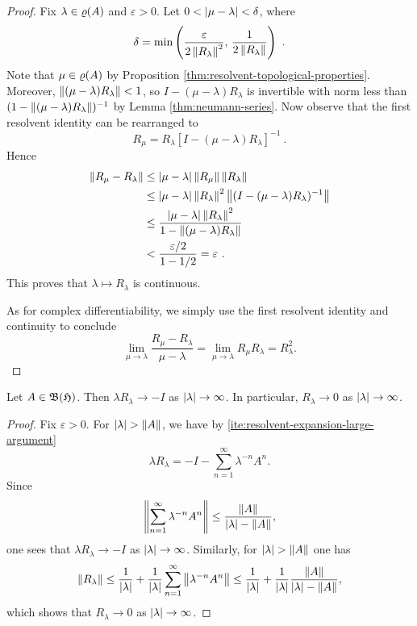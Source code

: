 \begin{proof}
Fix $\lambda \in \varrho(A)$ and $\varepsilon > 0$. Let $0 < {\left|\mu - \lambda\right|} < \delta$, where 
\[
  \delta = \min\left( \frac{\varepsilon}{2\left\|R_\lambda\right\|^2},\, \frac{1}{2\left\|R_\lambda\right\|} \right) \ .
\]
Note that $\mu \in \varrho(A)$ by Proposition \ref{thm:resolvent-topological-properties}. Moreover, $\left\|(\mu - \lambda)R_\lambda\right\| <1$, so $I - (\mu - \lambda)R_\lambda$ is invertible with norm less than $(1 - \left\|(\mu - \lambda) R_\lambda\right\|)^{-1}$ by Lemma \ref{thm:neumann-series}.
Now observe that the first resolvent identity can be rearranged to
\[
R_\mu =  R_\lambda[I - (\mu - \lambda)R_\lambda]^{-1} \ .
\]
Hence
\begin{align*}
\left\|R_\mu - R_\lambda\right\| &\leq {\left|\mu - \lambda\right|}\left\|R_\mu\right\|\left\|R_\lambda\right\| \\
&\leq {\left|\mu - \lambda\right|} \left\|R_\lambda\right\|^2 \left\|(I - (\mu - \lambda)R_\lambda)^{-1}\right\|\\
&\leq \frac{{\left|\mu - \lambda\right|} \left\|R_\lambda\right\|^2}{1 - \left\|(\mu - \lambda)R_\lambda\right\|}\\
&< \frac{\varepsilon/2}{1-1/2} = \varepsilon \ .
\end{align*}
This proves that $\lambda \mapsto R_\lambda$ is continuous. 

As for complex differentiability, we simply use the first resolvent identity and continuity to conclude
\[
\lim_{\mu \rightarrow \lambda} \frac{R_\mu - R_\lambda}{\mu - \lambda} = \lim_{\mu \rightarrow \lambda} R_\mu R_\lambda = R_\lambda^2. 
\]
\end{proof}

\begin{proposition}\label{thm:resolvent-limes-infinity}
Let $A \in \mathfrak{B}(\mathfrak{H})$. Then $\lambda R_\lambda \rightarrow -I$ as ${\left|\lambda\right|} \rightarrow \infty$. In particular, $R_\lambda \rightarrow 0$ as ${\left|\lambda\right|} \rightarrow \infty$.
\end{proposition}

\begin{proof}
Fix $\varepsilon > 0$.  For ${\left|\lambda\right|} > \left\|A\right\|$, we have by  \ref{ite:resolvent-expansion-large-argument}
\[
\lambda R_\lambda = -I - \sum_{n=1}^\infty \lambda^{-n}A^n.
\]
Since 
\[
\left\|\sum_{n=1}^\infty \lambda^{-n}A^n\right\| \leq  \frac{\left\|A\right\|}{{\left|\lambda\right|}-\left\|A\right\|},
\]
one sees that $\lambda R_\lambda \rightarrow - I$ as ${\left|\lambda\right|} \rightarrow \infty$. Similarly, for ${\left|\lambda\right|} > \left\|A\right\|$ one has
\[
\left\|R_\lambda\right\| \leq \frac{1}{{\left|\lambda\right|}} + \frac{1}{{\left|\lambda\right|}}\sum_{n=1}^\infty \left\|\lambda^{-n}A^n\right\| \leq \frac{1}{{\left|\lambda\right|}} + \frac{1}{{\left|\lambda\right|}} \frac{\left\|A\right\|}{{\left|\lambda\right|} - \left\|A\right\|},
\]
which shows that $R_\lambda \rightarrow 0$ as ${\left|\lambda\right|} \rightarrow \infty$.
\end{proof}

